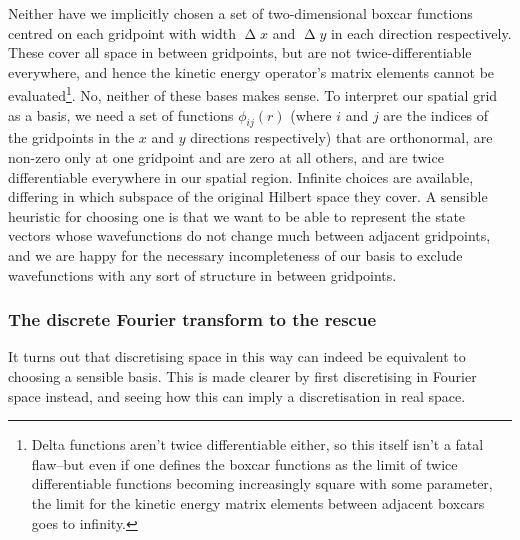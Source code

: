 Neither have we implicitly chosen a set of two-dimensional boxcar functions centred on each gridpoint with width $\upDelta x$ and $\upDelta y$ in each direction respectively. These cover all space in between gridpoints, but are not twice-differentiable everywhere, and hence the kinetic energy operator's matrix elements cannot be evaluated\footnote{Delta functions aren't twice differentiable either, so this itself isn't a fatal flaw--but even if one defines the boxcar functions as the limit of twice differentiable functions becoming increasingly square with some parameter, the limit for the kinetic energy matrix elements between adjacent boxcars goes to infinity.}. No, neither of these bases makes sense. To interpret our spatial grid as a basis, we need a set of functions $\phi_{ij}(r)$ (where $i$ and $j$ are the indices of the gridpoints in the $x$ and $y$ directions respectively) that are orthonormal, are non-zero only at one gridpoint and are zero at all others, and are twice differentiable everywhere in our spatial region. Infinite choices are available, differing in which subspace of the original Hilbert space they cover. A sensible heuristic for choosing one is that we want to be able to represent the state vectors whose wavefunctions do not change much between adjacent gridpoints, and we are happy for the necessary incompleteness of our basis to exclude wavefunctions with any sort of structure in between gridpoints.

\subsubsection{The discrete Fourier transform to the rescue}\label{sec:dft}

It turns out that discretising space in this way can indeed be equivalent to choosing a sensible basis. This is made clearer by first discretising in Fourier space instead, and seeing how this can imply a discretisation in real space.

